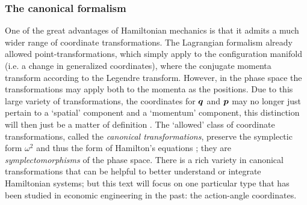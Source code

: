 \subsubsection{The canonical formalism}
One of the great advantages of Hamiltonian mechanics is that it admits a much wider range of coordinate transformations. The Lagrangian formalism already allowed point-transformations, which simply apply to the configuration manifold (i.e. a change in generalized coordinates), where the conjugate momenta transform according to the Legendre transform. However, in the phase space the transformations may apply both to the momenta as the positions. Due to this large variety of transformations, the coordinates for \(\vb*{q}\) and \(\vb*{p}\) may no longer just pertain to a `spatial' component and a `momentum' component, this distinction will then just be a matter of definition \cite{Landau1960}. The `allowed' class of coordinate transformations, called the \emph{canonical transformations}, preserve the symplectic form $\omega^2$ and thus the form of Hamilton's equations \cite{Arnold1989}; they are \emph{symplectomorphisms} of the phase space. There is a rich variety in canonical transformations that can be helpful to better understand or integrate Hamiltonian systems; but this text will focus on one particular type that has been studied in economic engineering in the past: the action-angle coordinates.

